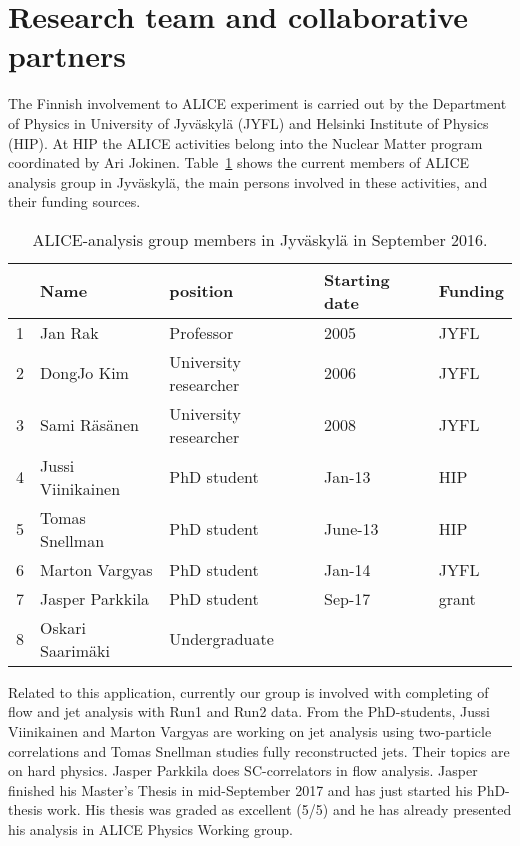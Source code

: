 
\section{Research team and collaborative partners} %
\label{sec:reseachteam}

The Finnish involvement to ALICE experiment is carried out by the Department of Physics in University of Jyv\"askyl\"a (JYFL) and Helsinki Institute of Physics (HIP). At HIP the ALICE activities belong into the Nuclear Matter program coordinated by Ari Jokinen. Table~\ref{tab:personnel} shows the current members of ALICE analysis group in Jyv\"askyl\"a, the main persons involved in these activities, and their funding sources.

\begin{table}[htp]
\caption{ALICE-analysis group members in Jyv\"askyl\"a in September 2016.}
\begin{center}
\begin{tabular}{|l|l|l|l|l|}
\hline
   &  Name                       &  position         & Starting date & Funding \\
\hline
1 &    Jan  Rak                  & Professor       &  2005           & JYFL \\
2 &    DongJo   Kim          & University researcher     &  2006 & JYFL \\
3 &    Sami   R\"as\"anen & University researcher     &  2008 & JYFL \\
 \hline
4 &    Jussi   Viinikainen   & PhD student   & Jan-13         & HIP \\
5 &    Tomas Snellman     & PhD student   & June-13       & HIP \\
6 &    Marton Vargyas      & PhD student   & Jan-14         & JYFL \\
7 &    Jasper Parkkila       & PhD student   & Sep-17         & grant \\
\hline
8 &    Oskari Saarim\"aki & Undergraduate   &          &  \\
\hline
\end{tabular}
\end{center}
\label{tab:personnel}
\end{table}%

Related to this application, currently our group is involved with completing of flow and jet analysis with Run1 and Run2 data. From the PhD-students, Jussi Viinikainen and Marton Vargyas are working on jet analysis using two-particle correlations and Tomas Snellman studies fully reconstructed jets. Their topics are on hard physics. Jasper Parkkila does SC-correlators in flow analysis. Jasper finished his Master's Thesis in mid-September 2017 and has just started his PhD-thesis work. His thesis was graded as excellent (5/5) and he has already presented his analysis in ALICE Physics Working group.

